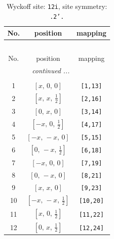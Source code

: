 \documentclass[fleqn,8pt]{jsarticle}
\begin{document}
\renewcommand{\arraystretch}{1.2}
\begin{longtable}{ccc}
\caption{Wyckoff site: {\tt 12i}, site symmetry: {\tt .2'.}}
 \\
 \hline \hline
No. & position & mapping \\ \hline \endfirsthead

\multicolumn{2}{l}{\tablename\ \thetable{}} \\
 \hline \hline
No. & position & mapping \\ \hline \endhead

 \hline \hline
\multicolumn{2}{r}{\footnotesize\it continued ...} \\ \endfoot

 \hline \hline
\multicolumn{2}{r}{} \\ \endlastfoot

1 & $\left[ x,\, 0,\, 0 \right]$ & {\tt [1,13]} \\ \hline
2 & $\left[ x,\, x,\, \frac{1}{2} \right]$ & {\tt [2,16]} \\ \hline
3 & $\left[ 0,\, x,\, 0 \right]$ & {\tt [3,14]} \\ \hline
4 & $\left[ - x,\, 0,\, \frac{1}{2} \right]$ & {\tt [4,17]} \\ \hline
5 & $\left[ - x,\, - x,\, 0 \right]$ & {\tt [5,15]} \\ \hline
6 & $\left[ 0,\, - x,\, \frac{1}{2} \right]$ & {\tt [6,18]} \\ \hline
7 & $\left[ - x,\, 0,\, 0 \right]$ & {\tt [7,19]} \\ \hline
8 & $\left[ 0,\, - x,\, 0 \right]$ & {\tt [8,21]} \\ \hline
9 & $\left[ x,\, x,\, 0 \right]$ & {\tt [9,23]} \\ \hline
10 & $\left[ - x,\, - x,\, \frac{1}{2} \right]$ & {\tt [10,20]} \\ \hline
11 & $\left[ x,\, 0,\, \frac{1}{2} \right]$ & {\tt [11,22]} \\ \hline
12 & $\left[ 0,\, x,\, \frac{1}{2} \right]$ & {\tt [12,24]} \\
\end{longtable}
\renewcommand{\arraystretch}{1.2}
\end{document}
